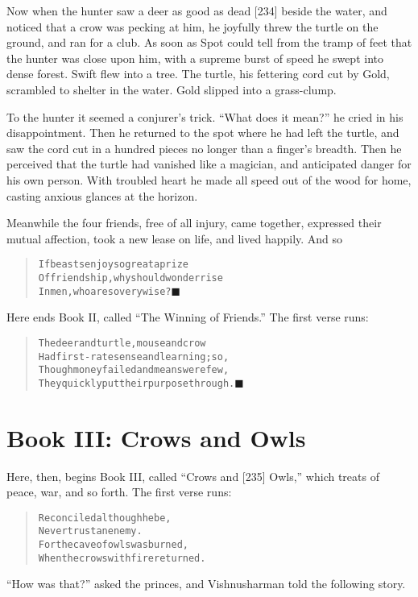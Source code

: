 \documentclass[article, twoside, 14pt]{memoir}
\newcommand{\qed}{\hfill \ensuremath{\blacksquare}}
\renewenvironment{verbatim}{%
\begin{quote}%
\vskip -10pt%
\begin{alltt}\normalfont\large}{\end{alltt}%
\end{quote}%
\vskip -10pt
} %
\begin{document}
Now when the hunter saw a deer as good as dead [234] beside the
water, and noticed that a crow was pecking at him, he joyfully
threw the turtle on the ground, and ran for a club. As soon as Spot
could tell from the tramp of feet that the hunter was close upon
him, with a supreme burst of speed he swept into dense forest.
Swift flew into a tree. The turtle, his fettering cord cut by Gold,
scrambled to shelter in the water. Gold slipped into a
grass-clump.

To the hunter it seemed a conjurer's trick. ``What does it mean?''
he cried in his disappointment. Then he returned to the spot where
he had left the turtle, and saw the cord cut in a hundred pieces no
longer than a finger's breadth. Then he perceived that the turtle
had vanished like a magician, and anticipated danger for his own
person. With troubled heart he made all speed out of the wood for
home, casting anxious glances at the horizon.

Meanwhile the four friends, free of all injury, came together,
expressed their mutual affection, took a new lease on life, and
lived happily. And so

\begin{verbatim}
If beasts enjoy so great a prize
Of friendship, why should wonder rise
In men, who are so very wise?\hyperref[s36]{\qed}
\end{verbatim}
Here ends Book II, called ``The Winning of Friends.'' The first
verse runs:

\begin{verbatim}
The deer and turtle, mouse and crow
Had first-rate sense and learning; so,
Though money failed and means were few,
They quickly put their purpose through.\hyperref[s35]{\qed}
\end{verbatim}
\section{Book III: Crows and Owls}

\label{s46}

Here, then, begins Book III, called ``Crows and [235] Owls,'' which
treats of peace, war, and so forth. The first verse runs:

\begin{verbatim}
Reconciled although he be,
Never trust an enemy.
For the cave of owls was burned,
When the crows with fire returned.
\end{verbatim}
``How was that?'' asked the princes, and Vishnusharman told the
following story.
\end{document}

